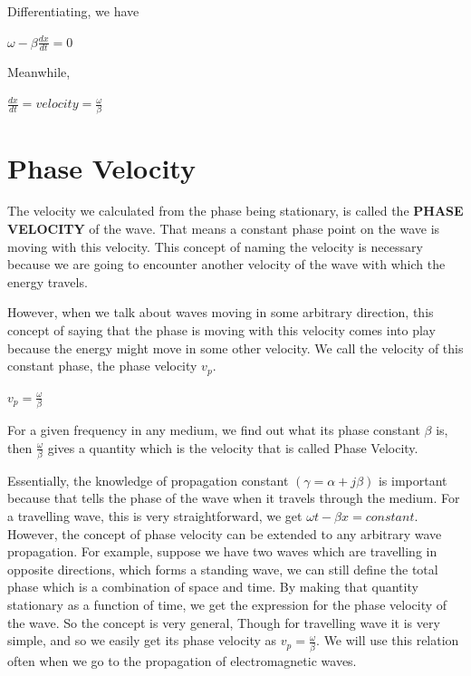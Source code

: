Differentiating, we have
\begin{center}
$\omega-\beta\frac{dx}{dt}=0$
\end{center}

Meanwhile, 
\begin{center}
$\frac{dx}{dt}=velocity=\frac{\omega}{\beta}$
\end{center}

\section{\textbf{Phase Velocity}}
The velocity we calculated from the phase being stationary, is called the \textbf{PHASE VELOCITY} of the wave. That means a constant phase point on the wave is moving with this velocity. This concept of naming the velocity is necessary because we are going to encounter another velocity of the wave with which the energy travels.

However, when we talk about waves moving in some arbitrary direction, this concept of saying that the phase is moving with this velocity comes into play because the energy might move in some other velocity. We call the velocity of this constant phase, the phase velocity $ v_p $.

\begin{center}
$ v_p=\frac{\omega}{\beta} $
\end{center}

For a given frequency in any medium, we find out what its phase constant $\beta  $ is, then $\frac{\omega}{\beta}$ gives a quantity which is the velocity that is called Phase Velocity.

Essentially, the knowledge of propagation constant $(\gamma=\alpha+j\beta)$ is important because that tells the phase of the wave when it travels through the medium.
For a travelling wave, this is very straightforward, we get $ \omega t-\beta x=constant $. However, the concept of phase velocity can be extended to any arbitrary wave propagation. For example, suppose we have two waves which are travelling in opposite directions, which forms a standing wave, we can still define the total phase which is a combination of space and time. By making that quantity stationary as a function of time, we get the expression for the phase velocity of the wave. So the concept is very general, Though for travelling wave it is very simple, and so we easily get its phase velocity as $v_p=\frac{\omega}{\beta}.$ We will use this relation often when we go to the propagation of electromagnetic waves.\newline

